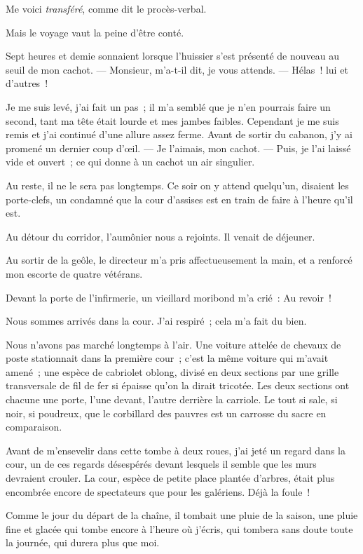 \documentclass[french,twoside]{book} %
\newcommand{\dateline}[1]{\medskip{\RaggedLeft{#1}\par}\bigskip}
\begin{document}
\dateline{De la Conciergerie.}
\noindent Me voici \emph{transféré}, comme dit le procès-verbal.\par
Mais le voyage vaut la peine d’être conté.\par
Sept heures et demie sonnaient lorsque l’huissier s’est présenté de nouveau au seuil de mon cachot. — Monsieur, m’a-t-il dit, je vous attends. — Hélas ! lui et d’autres !\par
Je me suis levé, j’ai fait un pas ; il m’a semblé que je n’en pourrais faire un second, tant ma tête était lourde et mes jambes faibles. Cependant je me suis remis et j’ai continué d’une allure assez ferme. Avant de sortir du cabanon, j’y ai promené un dernier coup d’œil. — Je l’aimais, mon cachot. — Puis, je l’ai laissé vide et ouvert ; ce qui donne à un cachot un air singulier.\par
Au reste, il ne le sera pas longtemps. Ce soir on y attend quelqu’un, disaient les porte-clefs, un condamné que la cour d’assises est en train de faire à l’heure qu’il est.\par
 Au détour du corridor, l’aumônier nous a rejoints. Il venait de déjeuner.\par
Au sortir de la geôle, le directeur m’a pris affectueusement la main, et a renforcé mon escorte de quatre vétérans.\par
Devant la porte de l’infirmerie, un vieillard moribond m’a crié : Au revoir !\par
Nous sommes arrivés dans la cour. J’ai respiré ; cela m’a fait du bien.\par
Nous n’avons pas marché longtemps à l’air. Une voiture attelée de chevaux de poste stationnait dans la première cour ; c’est la même voiture qui m’avait amené ; une espèce de cabriolet oblong, divisé en deux sections par une grille transversale de fil de fer si épaisse qu’on la dirait tricotée. Les deux sections ont chacune une porte, l’une devant, l’autre derrière la carriole. Le tout si sale, si noir, si poudreux, que le corbillard des pauvres est un carrosse du sacre en comparaison.\par
Avant de m’ensevelir dans cette tombe à deux roues, j’ai jeté un regard dans la cour, un de ces regards désespérés devant lesquels il semble que les murs devraient crouler. La cour, espèce de petite place plantée d’arbres, était plus encombrée encore de spectateurs que pour les galériens. Déjà la foule !\par
Comme le jour du départ de la chaîne, il tombait une pluie de la saison, une pluie fine et glacée qui tombe encore à l’heure où j’écris, qui tombera sans doute toute la journée, qui durera plus que moi.\par
\end{document}
